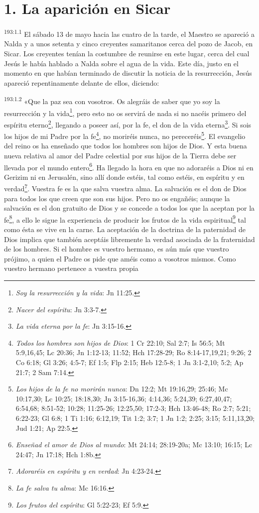 \section*{1. La aparición en Sicar}
\par 
\textsuperscript{193:1.1} El sábado 13 de mayo hacia las cuatro de la tarde, el Maestro se apareció a Nalda y a unos setenta y cinco creyentes samaritanos cerca del pozo de Jacob, en Sicar. Los creyentes tenían la costumbre de reunirse en este lugar, cerca del cual Jesús le había hablado a Nalda sobre el agua de la vida. Este día, justo en el momento en que habían terminado de discutir la noticia de la resurrección, Jesús apareció repentinamente delante de ellos, diciendo:

\par 
\textsuperscript{193:1.2} «Que la paz sea con vosotros. Os alegráis de saber que yo soy la resurrección y la vida\footnote{\textit{Soy la resurrección y la vida}: Jn 11:25.}, pero esto no os servirá de nada si no nacéis primero del espíritu eterno\footnote{\textit{Nacer del espíritu}: Jn 3:3-7.}, llegando a poseer así, por la fe, el don de la vida eterna\footnote{\textit{La vida eterna por la fe}: Jn 3:15-16.}. Si sois los hijos de mi Padre por la fe\footnote{\textit{Todos los hombres son hijos de Dios}: 1 Cr 22:10; Sal 2:7; Is 56:5; Mt 5:9,16,45; Lc 20:36; Jn 1:12-13; 11:52; Hch 17:28-29; Ro 8:14-17,19,21; 9:26; 2 Co 6:18; Gl 3:26; 4:5-7; Ef 1:5; Flp 2:15; Heb 12:5-8; 1 Jn 3:1-2,10; 5:2; Ap 21:7; 2 Sam 7:14.}, no moriréis nunca, no pereceréis\footnote{\textit{Los hijos de la fe no morirán nunca}: Dn 12:2; Mt 19:16,29; 25:46; Mc 10:17,30; Lc 10:25; 18:18,30; Jn 3:15-16,36; 4:14,36; 5:24,39; 6:27,40,47; 6:54,68; 8:51-52; 10:28; 11:25-26; 12:25,50; 17:2-3; Hch 13:46-48; Ro 2:7; 5:21; 6:22-23; Gl 6:8; 1 Ti 1:16; 6:12,19; Tit 1:2; 3:7; 1 Jn 1:2; 2:25; 3:15; 5:11,13,20; Jud 1:21; Ap 22:5.}. El evangelio del reino os ha enseñado que todos los hombres son hijos de Dios. Y esta buena nueva relativa al amor del Padre celestial por sus hijos de la Tierra debe ser llevada por el mundo entero\footnote{\textit{Enseñad el amor de Dios al mundo}: Mt 24:14; 28:19-20a; Mc 13:10; 16:15; Lc 24:47; Jn 17:18; Hch 1:8b.}. Ha llegado la hora en que no adoraréis a Dios ni en Gerizim ni en Jerusalén, sino allí donde estéis, tal como estéis, en espíritu y en verdad\footnote{\textit{Adoraréis en espíritu y en verdad}: Jn 4:23-24.}. Vuestra fe es la que salva vuestra alma. La salvación es el don de Dios para todos los que creen que son sus hijos. Pero no os engañéis; aunque la salvación es el don gratuito de Dios y se concede a todos los que la aceptan por la fe\footnote{\textit{La fe salva tu alma}: Mc 16:16.}, a ello le sigue la experiencia de producir los frutos de la vida espiritual\footnote{\textit{Los frutos del espíritu}: Gl 5:22-23; Ef 5:9.} tal como ésta se vive en la carne. La aceptación de la doctrina de la paternidad de Dios implica que también aceptáis libremente la verdad asociada de la fraternidad de los hombres. Si el hombre es vuestro hermano, es aún más que vuestro prójimo, a quien el Padre os pide que améis como a vosotros mismos. Como vuestro hermano pertenece a vuestra propia 